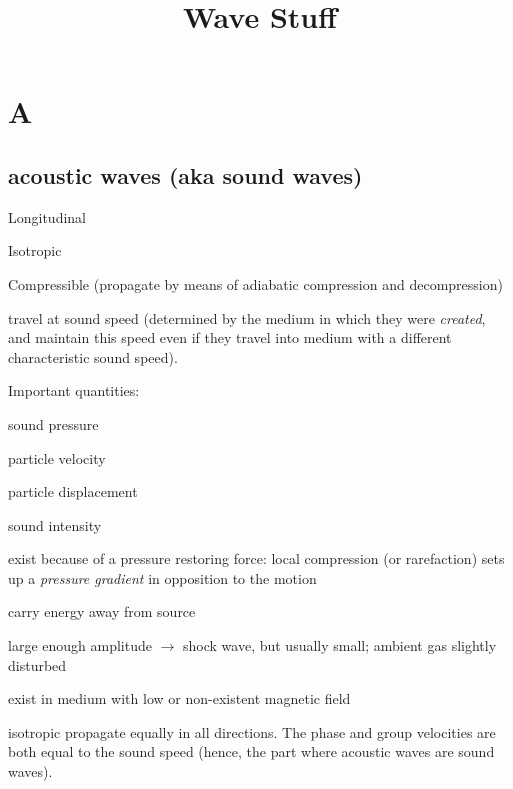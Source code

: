 \documentclass[12pt]{article}
\title{\vspace{-0.5in}Wave Stuff}
\author{}
\date{}
\begin{document}
\maketitle

\vspace{-1in}

\section*{A}

\subsection*{acoustic waves (aka sound waves)}
\begin{itemize*}
    \item Longitudinal
    \item Isotropic
    \item Compressible (propagate by means of adiabatic
        compression and decompression)
    \item travel at sound speed (determined by the medium in which
        they were \emph{created}, and maintain this speed even if they
        travel into medium with a different characteristic sound speed).
    \item Important quantities:
        \begin{itemize*}
            \item sound pressure
            \item particle velocity
            \item particle displacement
            \item sound intensity
        \end{itemize*}
    \item exist because of a pressure restoring force: local compression
        (or rarefaction) sets up a \emph{pressure gradient} in opposition
        to the motion
    \item carry energy away from source
    \item large enough amplitude $\rightarrow$ shock wave,
        but usually small; ambient gas slightly disturbed
    \item exist in medium with low or non-existent magnetic field
    \item isotropic \- propagate equally in all directions. The phase
        and group velocities are both equal to the sound speed (hence, the
        part where acoustic waves are sound waves).
\end{itemize*}
\end{document}
